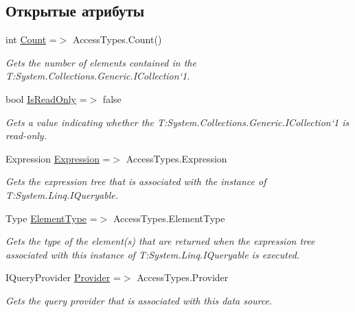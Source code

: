 \subsection*{Открытые атрибуты}
\begin{DoxyCompactItemize}
\item 
int \hyperlink{class_security_1_1_entity_framework_1_1_collections_1_1_access_type_collection_a8a8a696518750a60fd4c91e1b9bdc379}{Count} =$>$ Access\+Types.\+Count()
\begin{DoxyCompactList}\small\item\em Gets the number of elements contained in the T\+:\+System.\+Collections.\+Generic.\+I\+Collection`1. \end{DoxyCompactList}\item 
bool \hyperlink{class_security_1_1_entity_framework_1_1_collections_1_1_access_type_collection_a26c4ac1e425ca728ee970e2c75e6320b}{Is\+Read\+Only} =$>$ false
\begin{DoxyCompactList}\small\item\em Gets a value indicating whether the T\+:\+System.\+Collections.\+Generic.\+I\+Collection`1 is read-\/only. \end{DoxyCompactList}\item 
Expression \hyperlink{class_security_1_1_entity_framework_1_1_collections_1_1_access_type_collection_a1e2fd9534e15a7266ba726e96683d9f5}{Expression} =$>$ Access\+Types.\+Expression
\begin{DoxyCompactList}\small\item\em Gets the expression tree that is associated with the instance of T\+:\+System.\+Linq.\+I\+Queryable. \end{DoxyCompactList}\item 
Type \hyperlink{class_security_1_1_entity_framework_1_1_collections_1_1_access_type_collection_a05b866ff065913cc74c7db91375662b9}{Element\+Type} =$>$ Access\+Types.\+Element\+Type
\begin{DoxyCompactList}\small\item\em Gets the type of the element(s) that are returned when the expression tree associated with this instance of T\+:\+System.\+Linq.\+I\+Queryable is executed. \end{DoxyCompactList}\item 
I\+Query\+Provider \hyperlink{class_security_1_1_entity_framework_1_1_collections_1_1_access_type_collection_a3cd25e35c9889e8ef8eea2f5c07ee45a}{Provider} =$>$ Access\+Types.\+Provider
\begin{DoxyCompactList}\small\item\em Gets the query provider that is associated with this data source. \end{DoxyCompactList}\end{DoxyCompactItemize}
